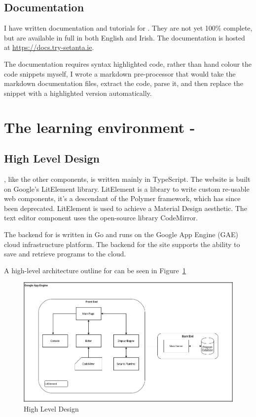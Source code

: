 \subsection{Documentation}

I have written documentation and tutorials for \Setanta{}. They are not yet 100\% complete, but are available in full in both English and Irish. The documentation is hosted at \url{https://docs.try-setanta.ie}.

The documentation requires syntax highlighted code, rather than hand colour the code snippets myself, I wrote a markdown pre-processor that would take the markdown documentation files, extract the \Setanta{} code, parse it, and then replace the snippet with a highlighted version automatically.

\section{The learning environment - \trys{}}

\subsection{High Level Design}

\trys{}, like the other components, is written mainly in TypeScript. The website is built on Google's LitElement library. LitElement is a library to write custom re-usable web components, it's a descendant of the Polymer framework, which has since been deprecated. LitElement is used to achieve a Material Design aesthetic. The text editor component uses the open-source library CodeMirror.

The backend for \trys{} is written in Go and runs on the Google App Engine (GAE) cloud infrastructure platform. The backend for the site supports the ability to save and retrieve \Setanta{} programs to the cloud.

A high-level architecture outline for \trys{} can be seen in Figure~\ref{trysetantadiagram}

\begin{figure}
    \caption{\trys{} High Level Design}
    \label{trysetantadiagram}
    \begin{center}
    \includegraphics[scale=0.4]{trysetantadiagram}
    \end{center}
\end{figure}


